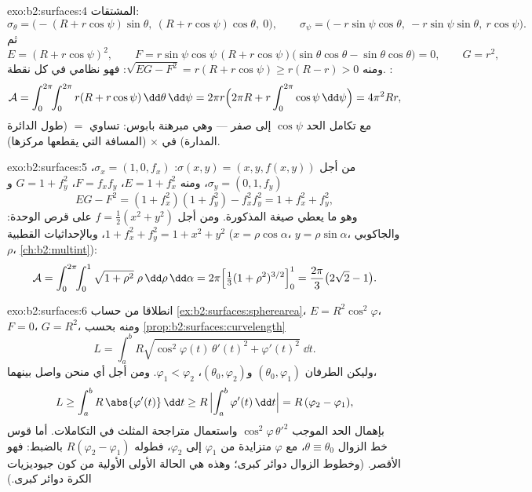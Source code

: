 \begin{solution}{exo:b2:surfaces:4}
المشتقات:
\[
\sigma_\theta = \bigl(-(R + r\cos\psi)\sin\theta,\
(R + r\cos\psi)\cos\theta,\ 0\bigr),
\qquad
\sigma_\psi = \bigl(-r\sin\psi\cos\theta,\
-r\sin\psi\sin\theta,\ r\cos\psi\bigr).
\]
ثم
\[
E = (R + r\cos\psi)^2,
\qquad
F = r\sin\psi\cos\psi\,(R + r\cos\psi)
\bigl(\sin\theta\cos\theta - \sin\theta\cos\theta\bigr) = 0,
\qquad
G = r^2 ,
\]
ومنه $\sqrt{EG - F^2} = r(R + r\cos\psi) \geq r(R - r) > 0$: فهو نظامي في كل نقطة. :
\[
\mathcal{A}
= \int_0^{2\pi}\!\!\int_0^{2\pi} r(R + r\cos\psi)
\,\dd\theta\,\dd\psi
= 2\pi r \Bigl(2\pi R + r\int_0^{2\pi}\cos\psi\,\dd\psi\Bigr)
= 4\pi^2 R r ,
\]
مع تكامل الحد $\cos\psi$ إلى صفر --- وهي مبرهنة بابوس:  تساوي
$=$ (طول الدائرة المدارة) في $\times$ (المسافة التي يقطعها مركزها).
\end{solution}

\begin{solution}{exo:b2:surfaces:5}
من أجل $\sigma(x, y) = (x, y, f(x,y))$: $\sigma_x = (1, 0, f_x)$، $\sigma_y = (0, 1, f_y)$، ومنه $E = 1 + f_x^2$، $F = f_xf_y$، $G = 1
+ f_y^2$ و
\[
EG - F^2 = (1 + f_x^2)(1 + f_y^2) - f_x^2f_y^2
= 1 + f_x^2 + f_y^2 ,
\]
وهو ما يعطي صيغة  المذكورة. ومن أجل $f = \frac12(x^2 + y^2)$ على قرص الوحدة:
$1 + f_x^2 + f_y^2 = 1 + x^2 + y^2$، وبالإحداثيات القطبية ($x = \rho\cos\alpha$، $y = \rho\sin\alpha$، والجاكوبي $\rho$،
\cref{ch:b2:multint}):
\[
\mathcal{A}
= \int_0^{2\pi}\!\!\int_0^1 \sqrt{1 + \rho^2}\;\rho
\,\dd\rho\,\dd\alpha
= 2\pi\Bigl[\tfrac13(1 + \rho^2)^{3/2}\Bigr]_0^1
= \frac{2\pi}{3}\bigl(2\sqrt2 - 1\bigr).
\]
\end{solution}

\begin{solution}{exo:b2:surfaces:6}
انطلاقا من حساب \cref{ex:b2:surfaces:spherearea}، $E =
R^2\cos^2\varphi$، $F = 0$، $G = R^2$، ومنه بحسب \cref{prop:b2:surfaces:curvelength}
\[
L = \int_a^b R\sqrt{\cos^2\varphi(t)\,\theta'(t)^2
+ \varphi'(t)^2}\;\dd t .
\]
وليكن الطرفان $(\theta_0, \varphi_1)$ و$(\theta_0,
\varphi_2)$، $\varphi_1 < \varphi_2$. ومن أجل أي منحن واصل بينهما،
\[
L \geq \int_a^b R\,\abs{\varphi'(t)}\,\dd t
\geq R\,\Bigl|\int_a^b \varphi'(t)\,\dd t\Bigr|
= R\,(\varphi_2 - \varphi_1),
\]
بإهمال الحد الموجب $\cos^2\varphi\,\theta'^2$ واستعمال متراجحة المثلث في التكاملات. أما
قوس خط الزوال $\theta \equiv \theta_0$، مع $\varphi$ متزايدة من $\varphi_1$ إلى $\varphi_2$، فطوله
$R(\varphi_2 - \varphi_1)$ بالضبط: فهو الأقصر. (وخطوط الزوال دوائر كبرى؛ وهذه هي الحالة
الأولى الأولية من كون جيوديزيات الكرة دوائر كبرى.)
\end{solution}

